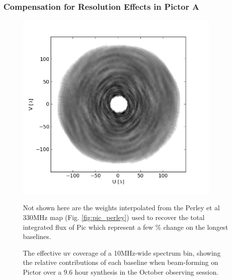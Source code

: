 \documentclass[preprint]{aastex}
\begin{document}

\subsubsection{Compensation for Resolution Effects in Pictor A}

\begin{figure}
\includegraphics[width=0.9\textwidth]{plots/PicA_Oct2011_uv_coverage.png}
\caption{The effective uv coverage of a 10MHz-wide spectrum bin, showing the relative contributions of each baseline when beam-forming on Pictor over a 9.6 hour synthesis in the October observing session. \label{fig:uv_coverage}}
Not shown here are the weights interpolated from the Perley et al 330MHz map (Fig. \ref{fig:pic_perley}) used to recover the total integrated flux of Pic  which represent a few \% change on the longest baselines.
\end{figure}
\end{document}
